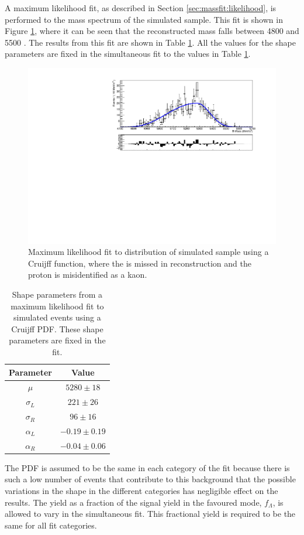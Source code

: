 A maximum likelihood fit, as described in Section \ref{sec:massfit:likelihood}, is performed to the \Bm mass spectrum of the simulated sample. This fit is shown in Figure \ref{Lbfit}, where it can be seen that the reconstructed \Bm mass falls between 4800 and 5500 \mevcc. The results from this fit are shown in Table \ref{fitresultsLb}. All the values for the shape parameters are fixed in the simultaneous fit to the values in Table \ref{fitresultsLb}.

\begin{figure}[h]
\centering
\includegraphics[width=0.7\linewidth]{figures/backgrounds/Lb2LcKst.pdf}
\caption{Maximum likelihood fit to distribution of simulated  sample using a Cruijff function, where the \pip is missed in reconstruction and the proton is misidentified as a kaon.}
\label{Lbfit}
\end{figure}

\begin{table}[h]
\centering
\begin{tabular}{cc}
\hline
Parameter & Value \\
\hline
$\mu$ & $5280 \pm 18$ \\
$\sigma_L$ & $221 \pm 26$ \\
$\sigma_R$ & $96 \pm 16$ \\
$\alpha_L$ & $-0.19 \pm 0.19$ \\
$\alpha_R$ & $-0.04 \pm 0.06$ \\
\hline
\end{tabular}
\caption{Shape parameters from a maximum likelihood fit to simulated \decay{\Lb}{\Lc\Km} events using a Cruijff PDF. These shape parameters are fixed in the \CP fit.}
\label{fitresultsLb}
\end{table}

The PDF is assumed to be the same in each \kk category of the \CP fit because there is such a low number of events that contribute to this background that the possible variations in the shape in the different categories has negligible effect on the results. The  yield as a fraction of the signal yield in the favoured \kpi mode, $f_{\Lambda}$, is allowed to vary in the simultaneous fit. This fractional yield is required to be the same for all fit categories.

